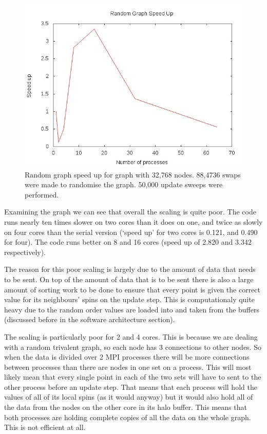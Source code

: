\documentclass[pdftex,12pt,a4paper]{article}
\begin{document}
\begin{figure}
\centering
\includegraphics[scale=0.8]{rand_speed.jpg}
\caption{Random graph speed up for graph with 32,768 nodes. 88,4736 swaps were made to randomise the graph. 50,000 update sweeps were performed.}
\end{figure}

Examining the graph we can see that overall the scaling is quite poor. The code runs nearly ten times slower on two cores than it does on one, and twice as slowly on four cores than the serial version (`speed up' for two cores is 0.121, and 0.490 for four). The code runs better on 8 and 16 cores (speed up of 2.820 and 3.342 respectively).

The reason for this poor scaling is largely due to the amount of data that needs to be sent. On top of the amount of data that is to be sent there is also a large amount of sorting work to be done to ensure that every point is given the correct value for its neighbours' spins on the update step. This is computationaly quite heavy due to the random order values are loaded into and taken from the buffers (discussed before in the software architecture section).

The scaling is particularly poor for 2 and 4 cores. This is because we are dealing with a random trivalent graph, so each node has 3 connections to other nodes. So when the data is divided over 2 MPI processes there will be more connections between processes than there are nodes in one set on a process. This will most likely mean that every single point in each of the two sets will have to sent to the other process before an update step. That means that each process will hold the values of all of its local spins (as it would anyway) but it would also hold all of the data from the nodes on the other core in its halo buffer. This means that both processes are holding complete copies of all the data on the whole graph. This is not efficient at all.
\end{document}
